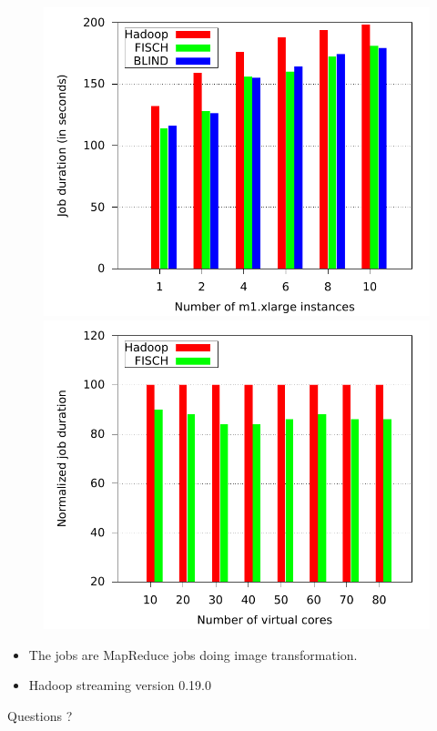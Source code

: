 \documentclass{beamer}
\begin{document}
\begin{frame}
  \begin{figure}
    \includegraphics[scale=0.4]{comp_hadoop_1}
    \hspace{1ex}
    \includegraphics[scale=0.4]{comp_hadoop_2}
  \end{figure}
  
  \vfill

  \begin{itemize}
  \item The jobs are MapReduce jobs doing image transformation.
  \item Hadoop streaming version 0.19.0
  \end{itemize}

\end{frame}

\begin{frame}
\begin{center}
\Huge
Questions ?
\end{center}
\end{frame}
\end{document}
